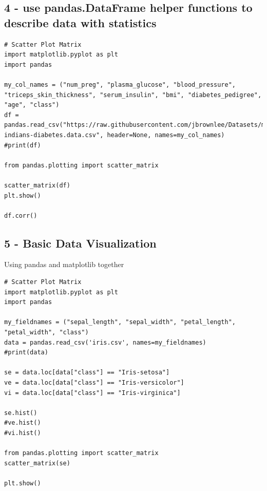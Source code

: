 \documentclass[11pt]{article}
\begin{document}
\subsection{4 - use pandas.DataFrame helper functions to describe data with statistics}
\label{sec:org8bd3c33}
\begin{verbatim}
# Scatter Plot Matrix
import matplotlib.pyplot as plt
import pandas

my_col_names = ("num_preg", "plasma_glucose", "blood_pressure", "triceps_skin_thickness", "serum_insulin", "bmi", "diabetes_pedigree", "age", "class")
df = pandas.read_csv("https://raw.githubusercontent.com/jbrownlee/Datasets/master/pima-indians-diabetes.data.csv", header=None, names=my_col_names)
#print(df)

from pandas.plotting import scatter_matrix

scatter_matrix(df)
plt.show()

df.corr()
\end{verbatim}
\subsection{5 - Basic Data Visualization}
\label{sec:orge0998f8}
Using pandas and matplotlib together
\begin{verbatim}
# Scatter Plot Matrix
import matplotlib.pyplot as plt
import pandas

my_fieldnames = ("sepal_length", "sepal_width", "petal_length", "petal_width", "class")
data = pandas.read_csv('iris.csv', names=my_fieldnames)
#print(data)

se = data.loc[data["class"] == "Iris-setosa"]
ve = data.loc[data["class"] == "Iris-versicolor"]
vi = data.loc[data["class"] == "Iris-virginica"]

se.hist()
#ve.hist()
#vi.hist()

from pandas.plotting import scatter_matrix
scatter_matrix(se)

plt.show()
\end{verbatim}
\end{document}
